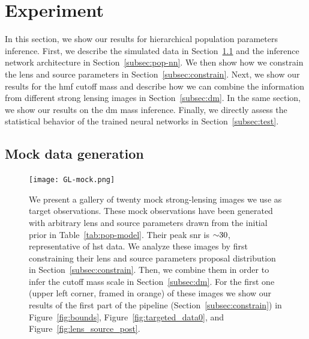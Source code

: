 \section{Experiment} 
\label{sec:sl-results}


In this section, we show our results for hierarchical population parameters inference. First, we describe the simulated data in Section~\ref{subsec:pop-data} and the inference network architecture in Section~\ref{subsec:pop-nn}. We then show how we constrain the lens and source parameters in Section~\ref{subsec:constrain}. Next, we show our results for the \gls*{hmf} cutoff mass and describe how we can combine the information from different strong lensing images in Section~\ref{subsec:dm}. In the same section, we show our results on the \gls*{dm} mass inference. Finally, we directly assess the statistical behavior of the trained neural networks in Section~\ref{subsec:test}.

\subsection{Mock data generation} 
\label{subsec:pop-data}

\begin{figure}
    \centering
    \texttt{[image: GL-mock.png]}
    \caption{We present a gallery of twenty mock strong-lensing images we use as target observations. These mock observations have been generated with arbitrary lens and source parameters drawn from the initial prior in Table~\ref{tab:pop-model}. Their peak \gls*{snr} is $\num{\sim 30}$, representative of \gls*{hst} data. We analyze these images by first constraining their lens and source parameters proposal distribution in Section~\ref{subsec:constrain}. Then, we combine them in order to infer the cutoff mass scale in Section~\ref{subsec:dm}. For the first one (upper left corner, framed in orange) of these images we show our results of the first part of the pipeline (Section~\ref{subsec:constrain}) in Figure~\ref{fig:bounds}, Figure~\ref{fig:targeted_data0}, and Figure~\ref{fig:lens_source_post}.
}
\label{fig:mock}
\end{figure}

